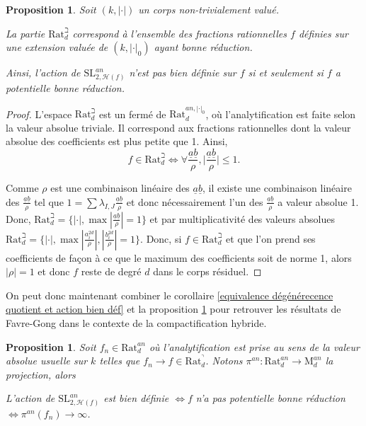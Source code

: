 \documentclass[11pt]{article}
\newcommand{\Rat}{\mathrm{Rat}}
\newcommand{\SL}{\mathrm{SL}}
\newcommand{\M}{\mathrm{M}}
\newtheorem{prop}[thm]{Proposition}
\begin{document}
\begin{prop}\label{caractérisation du beth de rat}
Soit $(k, |\cdot|)$ un corps non-trivialement valué.

La partie $\Rat_d^\beth$ correspond à l'ensemble des fractions rationnelles $f$ définies sur une extension valuée de $(k, |\cdot|_0)$ ayant bonne réduction.

Ainsi, l'action de $\SL^{an}_{2,\mathcal{H}(f)}$ n'est pas bien définie sur $f$ si et seulement si $f$ a potentielle bonne réduction. 
\end{prop}

\begin{proof}
L'espace $\Rat_d^\beth$ est un fermé de $\Rat_d^{an, |\cdot|_0}$, où l'analytification est faite selon la valeur absolue triviale. Il correspond aux fractions rationnelles dont la valeur absolue des coefficients est plus petite que 1. Ainsi, 
\begin{equation*}
f \in \Rat_d^\beth \iff \forall \frac{\underline{a} \underline{b}}{\rho}, \vert \frac{\underline{a} \underline{b}}{\rho} \vert \leq 1.
\end{equation*}

Comme $\rho$ est une combinaison linéaire des $\underline{a}\underline{b}$, il existe une combinaison linéaire des $\frac{\underline{a}\underline{b}}{\rho}$ tel que $1 = \sum \lambda_{I,J} \frac{\underline{a}\underline{b}}{\rho}$ et donc nécessairement l'un des $\frac{\underline{a}\underline{b}}{\rho}$ a valeur absolue 1. Donc, $\Rat_d^\beth = \lbrace |\cdot|, \max|\frac{\underline{a}\underline{b}}{\rho}| = 1\rbrace$ et par multiplicativité des valeurs absolues $\Rat_d^\beth = \lbrace |\cdot|, \max|\frac{a_i^{2d}}{\rho}|, |\frac{b_i^{2d}}{\rho}| = 1\rbrace$. Donc, si $f \in \Rat_d^\beth$ et que l'on prend ses coefficients de façon à ce que le maximum des coefficients soit de norme 1, alors $|\rho| = 1$ et donc $f$ reste de degré $d$ dans le corps résiduel. 
\end{proof}

On peut donc maintenant combiner le corollaire \ref{equivalence dégénérecence quotient et action bien déf} et la proposition \ref{caractérisation du beth de rat} pour retrouver les résultats de Favre-Gong dans le contexte de la compactification hybride. 

\begin{prop}\label{pot bonne reduc ssi degenere pas quotient}
Soit $f_n \in \Rat_d^{an}$ où l'analytification est prise au sens de la valeur absolue usuelle sur $k$ telles que $f_n \rightarrow f \in \Rat_d^\urcorner$. Notons $\pi^{an} : \Rat_d^{an} \rightarrow \M_d^{an}$ la projection, alors
\begin{center}
L'action de $\SL^{an}_{2,\mathcal{H}(f)}$ est bien définie $\iff f$ n'a pas potentielle bonne réduction$ \iff \pi^{an}(f_n) \rightarrow \infty$.
\end{center} 
\end{prop}
\end{document}
